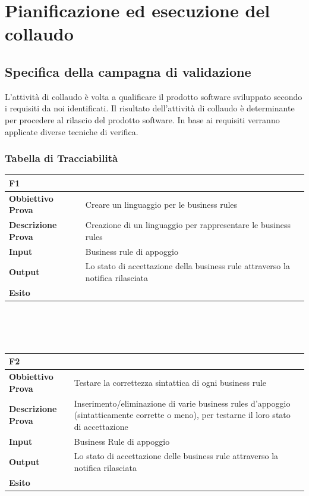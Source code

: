\documentclass[11pt,titlepage,a4paper]{report}
\begin{document}
\chapter[Collaudo]{Pianificazione ed esecuzione del collaudo}
\section[Campagna di validazione]{Specifica della campagna di validazione}
L'attivit\`a di collaudo \`e volta a qualificare il prodotto software sviluppato secondo i requisiti da noi identificati. Il risultato dell'attivit\`a di collaudo \`e determinante per procedere al rilascio del prodotto software. In base ai requisiti verranno applicate diverse tecniche di verifica.\subsection{Tabella di Tracciabilit\`a}
\begin{tabular}{||p{4.5cm}||p{7.5cm}||}
\hline
\textbf{\textsf{F1}}& \\
\hline
{\textbf {Obbiettivo Prova}}& Creare un linguaggio per le business rules \\ \hline
{\textbf{Descrizione Prova}}& Creazione di un linguaggio per rappresentare le business rules \\ \hline
{\textbf{Input}}&  Business rule di appoggio \\ \hline
{\textbf{Output}}& Lo stato di accettazione della business rule attraverso la notifica rilasciata\\ \hline
{\textbf{Esito}}&  \\ \hline
\end{tabular} \\
\\
\\
\begin{tabular}{||p{4.5cm}||p{7.5cm}||}
\hline
\textbf{\textsf{F2}}& \\
\hline
{\textbf {Obbiettivo Prova}}& Testare la correttezza sintattica di ogni business rule \\ \hline
{\textbf{Descrizione Prova}}& Inserimento/eliminazione di varie business rules d'appoggio (sintatticamente corrette o meno), per testarne il loro stato di accettazione \\ \hline
{\textbf{Input}}& Business Rule di appoggio \\ \hline
{\textbf{Output}}& Lo stato di accettazione delle business rule attraverso la notifica rilasciata \\ \hline
{\textbf{Esito}}&  \\ \hline
\end{tabular} \\
\end{document}
